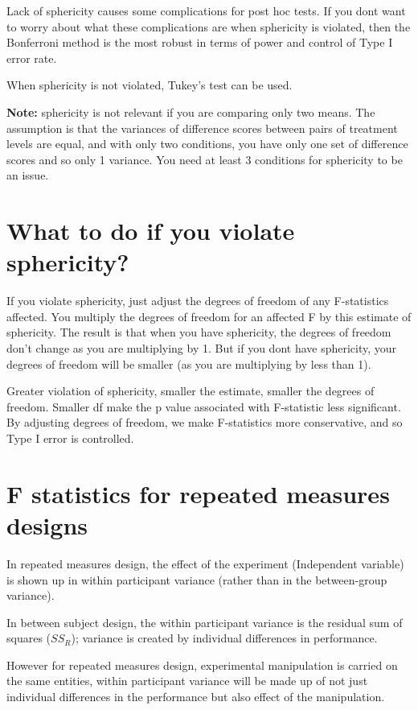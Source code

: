 Lack of sphericity causes some complications for post hoc tests. If you dont want to worry about what these complications are when sphericity is violated, then the Bonferroni method is the most robust in terms of power and control of Type I error rate.

When sphericity is not violated, Tukey's test can be used.

\textbf{Note:} sphericity is not relevant if you are comparing only two means. The assumption is that the variances of difference scores between pairs of treatment levels are equal, and with only two conditions, you have only one set of difference scores and so only 1 variance. You need at least 3 conditions for sphericity to be an issue. 


\section{What to do if you violate sphericity?}
If you violate sphericity, just adjust the degrees of freedom of any F-statistics affected. You multiply the degrees of freedom for an affected F by this estimate of sphericity. The result is that when you have sphericity, the degrees of freedom don't change as you are multiplying by 1. But if you dont have sphericity, your degrees of freedom will be smaller (as you are multiplying by less than 1).

Greater violation of sphericity, smaller the estimate, smaller the degrees of freedom.
Smaller df make the p value associated with F-statistic less significant. By adjusting degrees of freedom, we make F-statistics more conservative, and so Type I error is controlled.

\section{F statistics for repeated measures designs}
In repeated measures design, the effect of the experiment (Independent variable) is shown up in within participant variance (rather than in the between-group variance).

In between subject design, the within participant variance is the residual sum of squares ($SS_R$); variance is created by individual differences in performance.

However for repeated measures design, experimental manipulation is carried on the same entities, within participant variance will be made up of not just individual differences in the performance but also effect of the manipulation.


